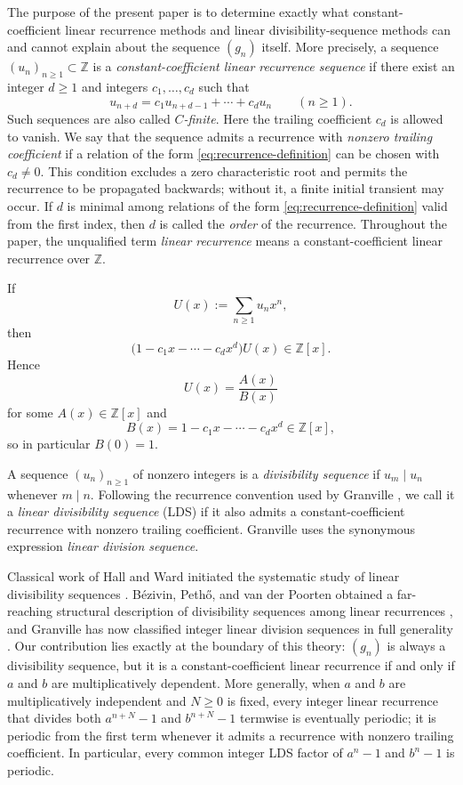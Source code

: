 \documentclass[11pt]{amsart}
\theoremstyle{remark}
\numberwithin{equation}{section}
\newcommand{\Z}{\mathbb Z}
\begin{document}
The purpose of the present paper is to determine exactly what constant-coefficient
linear recurrence methods and linear divisibility-sequence methods can and cannot
explain about the sequence $(g_n)$ itself.  More precisely, a sequence
$(u_n)_{n\ge 1}\subset\Z$ is a \emph{constant-coefficient linear recurrence
sequence} if there exist an integer $d\ge 1$ and integers $c_1,\dots,c_d$ such
that
\begin{equation}\label{eq:recurrence-definition}
  u_{n+d}=c_1u_{n+d-1}+\cdots+c_du_n
  \qquad(n\ge 1).
\end{equation}
Such sequences are also called \emph{$C$-finite}.  Here the trailing coefficient
$c_d$ is allowed to vanish.  We say that the sequence admits a recurrence with
\emph{nonzero trailing coefficient} if a relation of the form
\eqref{eq:recurrence-definition} can be chosen with $c_d\ne 0$.  This condition
excludes a zero characteristic root and permits the recurrence to be propagated
backwards; without it, a finite initial transient may occur.  If $d$ is minimal
among relations of the form \eqref{eq:recurrence-definition} valid from the first
index, then $d$ is called the \emph{order} of the recurrence.  Throughout the
paper, the unqualified term \emph{linear recurrence} means a
constant-coefficient linear recurrence over $\Z$.

If
\[
  U(x):=\sum_{n\ge 1}u_nx^n,
\]
then
\[
  \bigl(1-c_1x-\cdots-c_dx^d\bigr)U(x)\in\Z[x].
\]
Hence
\[
  U(x)=\frac{A(x)}{B(x)}
\]
for some $A(x)\in\Z[x]$ and
\[
  B(x)=1-c_1x-\cdots-c_dx^d\in\Z[x],
\]
so in particular $B(0)=1$.

A sequence $(u_n)_{n\ge 1}$ of nonzero integers is a \emph{divisibility
sequence} if $u_m\mid u_n$ whenever $m\mid n$.  Following the recurrence
convention used by Granville \cite{Gra22}, we call it a \emph{linear divisibility
sequence} (LDS) if it also admits a constant-coefficient recurrence with nonzero
trailing coefficient.  Granville uses the synonymous expression \emph{linear
division sequence}.

Classical work of Hall and Ward initiated the systematic study of linear
divisibility sequences \cite{Hall36,Ward37}.  B\'ezivin, Peth\H{o}, and van der
Poorten obtained a far-reaching structural description of divisibility sequences
among linear recurrences \cite{BPV90}, and Granville has now classified integer
linear division sequences in full generality \cite{Gra22}.  Our contribution lies
exactly at the boundary of this theory: $(g_n)$ is always a divisibility sequence,
but it is a constant-coefficient linear recurrence if and only if $a$ and $b$ are
multiplicatively dependent.  More generally, when $a$ and $b$ are multiplicatively
independent and $N\ge 0$ is fixed, every integer linear recurrence that divides
both $a^{n+N}-1$ and $b^{n+N}-1$ termwise is eventually periodic; it is periodic
from the first term whenever it admits a recurrence with nonzero trailing
coefficient.  In particular, every common integer LDS factor of $a^n-1$ and
$b^n-1$ is periodic.
\end{document}
